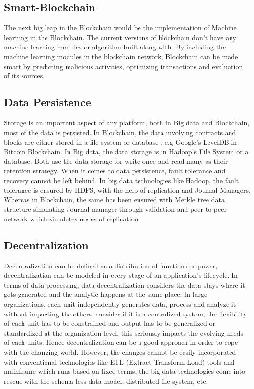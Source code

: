 \documentclass[sigconf]{acmart}
\begin{document}
\subsection{Smart-Blockchain}
The next big leap in the Blockchain would be the implementation of Machine learning in the Blockchain. The current versions of blockchain don't have any machine learning modules or algorithm built along with. By including the machine learning modules in the blockchain network, Blockchain can be made smart by predicting malicious activities, optimizing transactions and evaluation of its sources.

\subsection{Data Persistence}
Storage is an important aspect of any platform, both in Big data and Blockchain, most of the data is persisted. In Blockchain, the data involving contracts and blocks are either stored in a file system or database \cite{Antonopoulos:2014:MBU:2695500}, e.g Google's LevelDB in Bitcoin Blockchain. In Big data, the data storage is in Hadoop's File System or a database. Both use the data storage for write once and read many as their retention strategy. When it comes to data persistence, fault tolerance and recovery cannot be left behind. In big data technologies like Hadoop, the fault tolerance is ensured by HDFS, with the help of replication and Journal Managers. Whereas in Blockchain, the same has been ensured with Merkle tree data structure simulating Journal manager through validation and peer-to-peer network which simulates nodes of replication. 

\subsection{Decentralization}
Decentralization can be defined as a distribution of functions or power\cite{Dictionery}, decentralization can be modeled in every stage of an application's lifecycle. In terms of data processing, data decentralization considers the data stays where it gets generated and the analytic happens at the same place. In large organizations, each unit independently generates data, process and analyze it without impacting the others. consider if it is a centralized system, the flexibility of each unit has to be constrained and output has to be generalized or standardized at the organization level, this seriously impacts the evolving needs of each units\cite{IsDataDe19:online}. Hence decentralization can be a good approach in order to cope with the changing world. However, the changes cannot be easily incorporated with conventional technologies like ETL (Extract-Transform-Load) tools and mainframe which runs based on fixed terms, the big data technologies come into rescue with the schema-less data model, distributed file system, etc.
\end{document}
